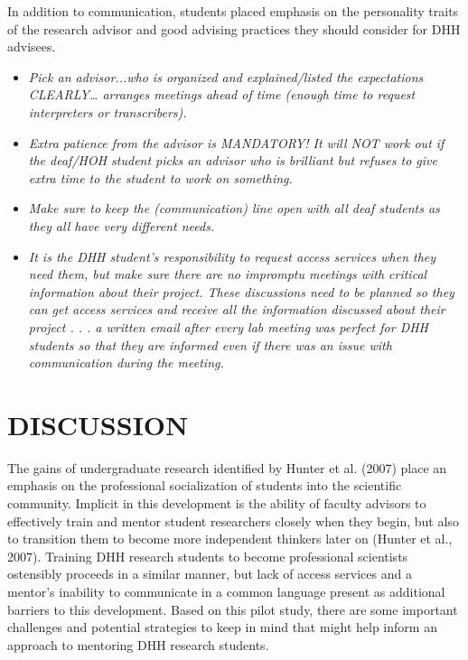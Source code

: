 \documentclass[11.5pt]{sig-alternate} %
\begin{document}
\begin{large}
In addition to communication, students placed emphasis on the personality traits of the research advisor and good advising practices they should consider for DHH advisees.
\begin{itemize}
    \item \textit{Pick an advisor...who is organized and explained/listed the expectations CLEARLY… arranges meetings ahead of time (enough time to request interpreters or transcribers).}
    \item \textit{Extra patience from the advisor is MANDATORY! It will NOT work out if the deaf/HOH student picks an advisor who is brilliant but refuses to give extra time to the student to work on something.}
    \item \textit{Make sure to keep the (communication) line open with all deaf students as they all have very different needs.}
    \item \textit{It is the DHH student’s responsibility to request access services when they need them, but make sure there are no impromptu meetings with critical information about their project. These discussions need to be planned so they can get access services and receive all the information discussed about their project . . . a written email after every lab meeting was perfect for DHH students so that they are informed even if there was an issue with communication during the meeting.}
\end{itemize}

\section*{DISCUSSION}

The gains of undergraduate research identified by Hunter et al. (2007) place an emphasis on the professional socialization of students into the scientific community. Implicit in this development is the ability of faculty advisors to effectively train and mentor student researchers closely when they begin, but also to transition them to become more independent thinkers later on (Hunter et al., 2007). Training DHH research students to become professional scientists ostensibly proceeds in a similar manner, but lack of access services and a mentor’s inability to communicate in a common language present as additional barriers to this development. Based on this pilot study, there are some important challenges and potential strategies to keep in mind that might help inform an approach to mentoring DHH research students. 


\end{large}
\end{document}
